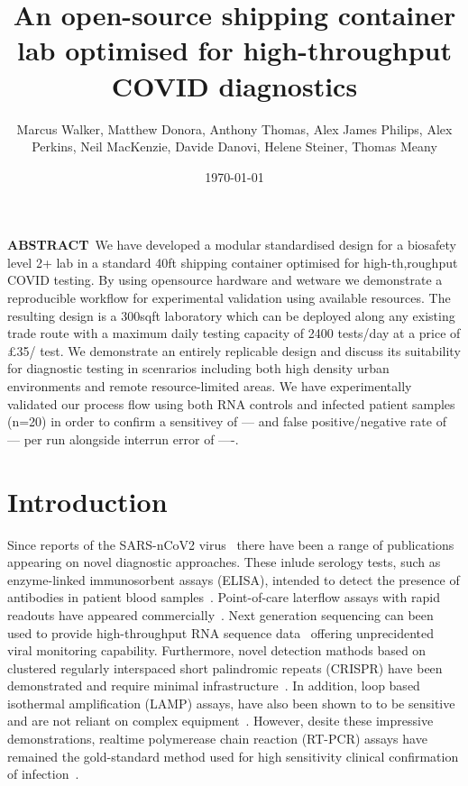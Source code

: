 \documentclass[a4paper,12pt]{article}
\begin{document}
\title{An open-source shipping container lab optimised for high-throughput COVID diagnostics}
\author{Marcus Walker, Matthew Donora, Anthony Thomas, Alex James Philips, Alex Perkins, Neil MacKenzie, Davide Danovi, Helene Steiner, Thomas Meany}
\date{\today}
\maketitle

\textbf{ABSTRACT}~We have developed a modular standardised design for a biosafety level 2+ lab in a standard 40ft shipping container optimised for high-th,roughput COVID testing. By using opensource hardware and wetware we demonstrate a reproducible workflow for experimental validation using available resources. The resulting design is a 300sqft laboratory which can be deployed along any existing trade route with a maximum daily testing capacity of 2400 tests/day at a price of £35/ test. We demonstrate an entirely replicable design and discuss its suitability for diagnostic testing in scenrarios including both high density urban environments and remote resource-limited areas. We have experimentally validated our process flow using both RNA controls and infected patient samples (n=20) in order to confirm a sensitivey of --- and false positive/negative rate of --- per run alongside interrun error of ----. 

\section{Introduction}

Since reports of the SARS-nCoV2 virus~\cite{Zhou2020} there have been a range of publications appearing on novel diagnostic approaches. These inlude serology tests, such as enzyme-linked immunosorbent assays (ELISA), intended to detect the presence of antibodies in patient blood samples~\cite{Amanat2020, Li2020}. Point-of-care laterflow assays with rapid readouts have appeared commercially~\cite{Sheridan2020,Sheridan2020a}. Next generation sequencing can been used to provide high-throughput RNA sequence data~\cite{AyaanHossain2020} offering unprecidented viral monitoring capability. Furthermore, novel detection mathods based on clustered regularly interspaced short palindromic repeats (CRISPR) have been demonstrated and require minimal infrastructure~\cite{Curti2020,Broughton2020,Zhang}. In addition, loop based isothermal amplification (LAMP) assays, have also been shown to to be sensitive and are not reliant on complex equipment~\cite{Huang,Schmid-Burgk2020}. However, desite these impressive demonstrations, realtime polymerease chain reaction (RT-PCR) assays have remained the gold-standard method used for high sensitivity clinical confirmation of infection~\cite{NHSEnglandandNHSImprovement2020}.
\end{document}
